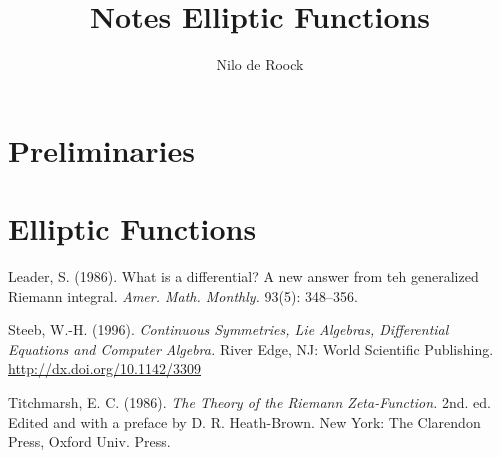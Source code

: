 \documentclass[oneside]{book}
\theoremstyle{theorem}
\theoremstyle{definition}
\begin{document}
    \title{Notes Elliptic Functions}

    \author{Nilo de Roock}

    \maketitle

    \tableofcontents

    \chapter{Preliminaries}
    

    \chapter{Elliptic Functions}
    



    \begin{thebibliography}{3}

        Leader, S. (1986). What is a differential? A new answer from teh generalized Riemann integral. {\it Amer. Math. Monthly.\/} 93(5): 348--356.

        Steeb, W.-H. (1996). \textit{Continuous Symmetries, Lie Algebras, Differential Equations and Computer Algebra.\/} River Edge, NJ: World Scientific Publishing.  \href{http://dx.doi.org/10.1142/3309}{\url{http://dx.doi.org/10.1142/3309}}

        Titchmarsh, E. C. (1986). {\it The Theory of the Riemann Zeta-Function.\/} 2nd. ed. Edited and with a preface by D. R. Heath-Brown. New York: The Clarendon Press, Oxford Univ. Press.

    \end{thebibliography}
\end{document}
